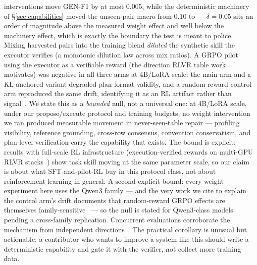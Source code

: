 \documentclass[11pt]{article}
\begin{document}
interventions move GEN-F1 by at most $0.005$, while the deterministic machinery of
\S\ref{sec:capabilities} moved the unseen-pair macro from $0.10$ to \unseenMacroF{}
--- $\delta{=}0.05$ sits an order of magnitude above the measured weight effect and
well below the machinery effect, which is exactly the boundary the test is meant to
police. Mixing harvested pairs into the training blend
\emph{diluted} the synthetic skill the executor verifies (a monotonic dilution law
across mix ratios). A GRPO pilot using the executor as a verifiable reward (the
direction RLVR table work~\cite{tabler1} motivates) was negative in all three arms at
4B/LoRA scale: the main arm and a KL-anchored variant degraded plan-format validity,
and a random-reward control arm reproduced the same drift, identifying it as an RL
artifact rather than signal~\cite{spurious}. We state this as a \emph{bounded} null,
not a universal one: at 4B/LoRA scale, under our propose/execute protocol and
training budgets, no weight intervention we ran produced measurable movement in
never-seen-table repair --- profiling visibility, reference grounding, cross-row
consensus, convention conservatism, and plan-level verification carry the capability
that exists. The bound is explicit: results with full-scale RL infrastructure
(execution-verified rewards on multi-GPU RLVR stacks~\cite{spreadsheetrl,tabler1})
show task skill moving at the same parameter scale, so our claim is about what
SFT-and-pilot-RL buy in this protocol class, not about reinforcement learning in
general. A second explicit bound: every weight experiment here uses the Qwen3
family --- and the very work we cite to explain the control arm's drift documents
that random-reward GRPO effects are themselves family-sensitive~\cite{spurious}
--- so the null is stated for Qwen3-class models pending a cross-family
replication. Concurrent evaluations corroborate the mechanism from independent
directions~\cite{distort,debate}. The practical corollary is unusual but actionable:
a contributor who wants to improve a system like this should write a deterministic
capability and gate it with the verifier, not collect more training data.
\end{document}
